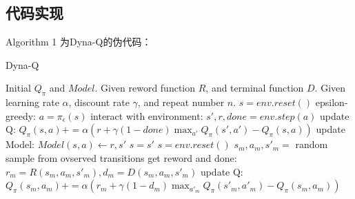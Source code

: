 \documentclass[a4paper,12pt]{article}
\begin{document}
\begin{CJK}{UTF8}{gbsn}
\subsection{代码实现}
Algorithm 1 为Dyna-Q的伪代码：
\begin{algorithm}[!h]
	\caption{Dyna-Q}
	\begin{algorithmic}[1]
		\STATE Initial $Q_\pi$ and $Model$. Given reword function $R$, and terminal function $D$. Given learning rate $\alpha$, discount rate $\gamma$, and repeat number $n$.
		\STATE $s=env.reset()$
		\STATE  epsilon-greedy: $a=\pi_\epsilon(s)$
		\STATE interact with environment: $s',r,done=env.step(a)$
		\STATE update Q: $Q_\pi(s,a)+=\alpha(r+\gamma(1-done)\max_{a'} Q_\pi(s',a')-Q_\pi(s,a))$
		\STATE update Model: $Model(s,a)\leftarrow r,s'$
		\STATE $s=s'$
		\STATE $s=env.reset()$
		\ENDIF
		\ENDFOR
		\STATE $s_m,a_m,s'_m=$ random sample from ovserved transitions
		\STATE get reword and done: $r_m=R(s_m,a_m,s'_m),d_m=D(s_m,a_m,s'_m)$
		\STATE update Q: $Q_\pi(s_m,a_m)+=\alpha(r_m+\gamma (1-d_m)\max_{a'_m} Q_\pi(s'_m,a'_m)-Q_\pi(s_m,a_m))$
		\ENDFOR
		\ENDFOR
	\end{algorithmic}
\end{algorithm}


\end{CJK}
\end{document}
